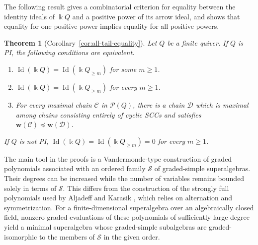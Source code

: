 \documentclass[11pt,reqno]{amsart}
\newtheorem{maintheorem}{Theorem}
\newcommand{\kk}{\Bbbk}
\newcommand{\Id}{\operatorname{Id}}
\theoremstyle{definition}
\theoremstyle{remark}
\numberwithin{equation}{section}
\begin{document}
The following result gives a combinatorial criterion for
equality between the identity ideals of $\kk Q$ and a
positive power of its arrow ideal, and shows that equality
for one positive power implies equality for all positive
powers.


\begin{maintheorem}[Corollary~\ref{cor:all-tail-equality}]
\label{main:paths}
Let $Q$ be a finite quiver. If $Q$ is PI, the following
conditions are equivalent. 
\begin{enumerate}
\item $\Id(\kk Q)=\Id(\kk Q_{\ge m})$ for some $m\ge1$.
\item $\Id(\kk Q)=\Id(\kk Q_{\ge m})$ for every $m\ge1$.
\item For every maximal chain $\mathcal C$ in $\mathcal P(Q)$,
there is a chain $\mathcal D$ which is maximal among chains
consisting entirely of cyclic SCCs and satisfies
$\mathbf w(\mathcal C)\preceq\mathbf w(\mathcal D)$.
\end{enumerate}
If $Q$ is not PI, $\Id(\kk Q)=\Id(\kk Q_{\ge m})=0$ for every $m\ge1$.
\end{maintheorem}


The main tool in the proofs is a Vandermonde-type construction
of graded polynomials associated with an ordered family
$\mathcal S$ of graded-simple superalgebras.
Their degrees can be increased while the number of variables
remains bounded solely in terms of $\mathcal S$.
This differs from the construction of the strongly full
polynomials used by Aljadeff and Karasik
\cite{AljadeffKarasik2024}, which relies on alternation and
symmetrization.
For a finite-dimensional superalgebra over an algebraically
closed field, nonzero graded evaluations of these polynomials
of sufficiently large degree yield a minimal superalgebra
whose graded-simple subalgebras are graded-isomorphic to
the members of $\mathcal S$ in the given order.
\end{document}
